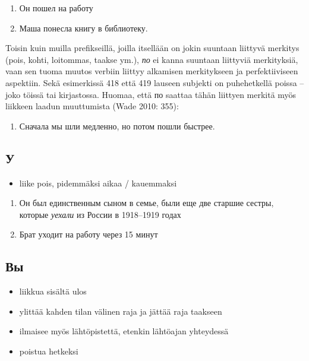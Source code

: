 \documentclass[]{scrreprt}
\providecommand{\tightlist}{%
  \setlength{\itemsep}{0pt}\setlength{\parskip}{0pt}}
\begin{document}
\begin{enumerate}
\def\labelenumi{(\arabic{enumi})}
\setcounter{enumi}{417}
\tightlist
\item
  Он пошел на работу
\item
  Маша понесла книгу в библиотеку.
\end{enumerate}

Toisin kuin muilla prefikseillä, joilla itsellään on jokin suuntaan
liittyvä merkitys (pois, kohti, loitommas, taakse ym.), \emph{по} ei
kanna suuntaan liittyviä merkityksiä, vaan sen tuoma muutos verbiin
liittyy alkamisen merkitykseen ja perfektiiviseen aspektiin. Sekä
esimerkissä 418 että 419 lauseen subjekti on puhehetkellä poissa -- joko
töissä tai kirjastossa. Huomaa, että по saattaa tähän liittyen merkitä
myös liikkeen laadun muuttumista (Wade 2010: 355):

\begin{enumerate}
\def\labelenumi{(\arabic{enumi})}
\setcounter{enumi}{419}
\tightlist
\item
  Сначала мы шли медленно, но потом пошли быстрее.
\end{enumerate}

\subsection{У}\label{ux443}

\begin{itemize}
\tightlist
\item
  liike pois, pidemmäksi aikaa / kauemmaksi
\end{itemize}

\begin{enumerate}
\def\labelenumi{(\arabic{enumi})}
\setcounter{enumi}{420}
\tightlist
\item
  Он был единственным сыном в семье, были еще две старшие сестры,
  которые \emph{уехали} из России в 1918--1919 годах
\item
  Брат уходит на работу через 15 минут
\end{enumerate}

\subsection{Вы}\label{ux432ux44b}

\begin{itemize}
\tightlist
\item
  liikkua sisältä ulos
\item
  ylittää kahden tilan välinen raja ja jättää raja taakseen\\
\item
  ilmaisee myös lähtöpistettä, etenkin lähtöajan yhteydessä
\item
  poistua hetkeksi
\end{itemize}
\end{document}

